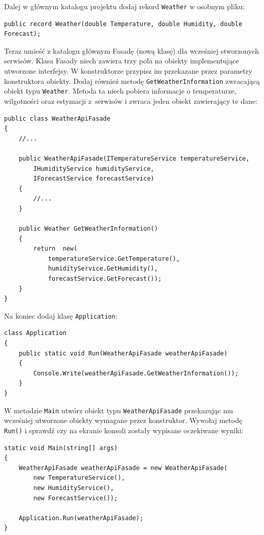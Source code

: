 Dalej w głównym katalogu projektu dodaj rekord \texttt{Weather} w osobnym pliku:
\begin{lstlisting}	
public record Weather(double Temperature, double Humidity, double Forecast);
\end{lstlisting}

Teraz umieść z katalogu głównym Fasadę (nową klasę) dla wcześniej stworzonych serwisów. Klasa Fasady niech zawiera trzy pola na obiekty implementujące utworzone interfejsy. W konstruktorze przypisz im przekazane przez parametry konstruktora obiekty. Dodaj również metodę \texttt{GetWeatherInformation} zwracającą obiekt typu \texttt{Weather}. Metoda ta niech pobiera informacje o temperaturze, wilgotności oraz estymacji z~serwisów i zwraca jeden obiekt zawierający te dane:
\begin{lstlisting}	
public class WeatherApiFasade
{
	//...
	
	public WeatherApiFasade(ITemperatureService temperatureService, 
		IHumidityService humidityService,
		IForecastService forecastService)
	{
		//...
	}
	
	public Weather GetWeatherInformation()
	{
		return  new(
			temperatureService.GetTemperature(),
			humidityService.GetHumidity(),
			forecastService.GetForecast());
	}
}
\end{lstlisting}

Na koniec dodaj klasę \texttt{Application}:
\begin{lstlisting}	
class Application
{
	public static void Run(WeatherApiFasade weatherApiFasade)
	{
		Console.Write(weatherApiFasade.GetWeatherInformation());
	}
}
\end{lstlisting}
W metodzie \texttt{Main} utwórz obiekt typu \texttt{WeatherApiFasade} przekazując mu wcześniej utworzone obiekty wymagane przez konstruktor. Wywołaj metodę \texttt{Run()} i sprawdź czy na ekranie konsoli zostały wypisane oczekiwane wyniki:
\begin{lstlisting}	
static void Main(string[] args)
{
	WeatherApiFasade weatherApiFasade = new WeatherApiFasade(
		new TemperatureService(), 
		new HumidityService(),
		new ForecastService());
	
	Application.Run(weatherApiFasade);
}
\end{lstlisting}
